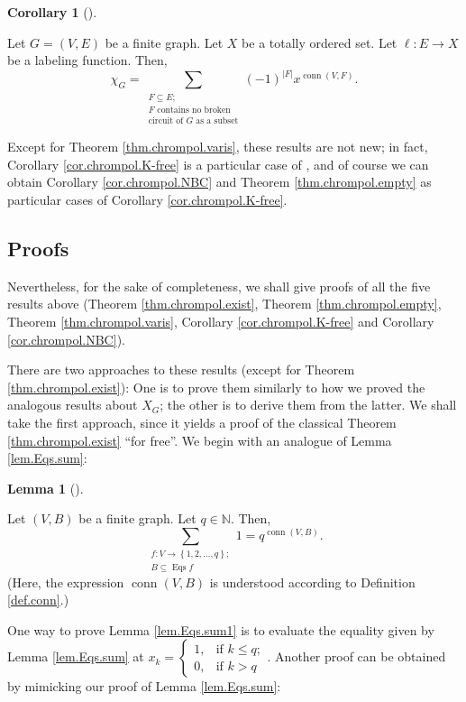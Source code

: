 \documentclass[numbers=enddot,12pt,final,onecolumn,notitlepage]{scrartcl}%
\theoremstyle{definition}
\newtheorem{lem}[theo]{Lemma}
\newenvironment{lemma}[1][]
{\begin{lem}[#1]\begin{leftbar}}
{\end{leftbar}\end{lem}}
\newtheorem{coro}[theo]{Corollary}
\newenvironment{corollary}[1][]
{\begin{coro}[#1]\begin{leftbar}}
{\end{leftbar}\end{coro}}
\let\sumnonlimits\sum
\renewcommand{\sum}{\sumnonlimits\limits}
\begin{document}
\begin{corollary}
\label{cor.chrompol.NBC}Let $G=\left(  V,E\right)  $ be a finite graph. Let
$X$ be a totally ordered set. Let $\ell:E\rightarrow X$ be a labeling
function. Then,%
\[
\chi_{G}=\sum_{\substack{F\subseteq E;\\F\text{ contains no broken}%
\\\text{circuit of }G\text{ as a subset}}}\left(  -1\right)  ^{\left\vert
F\right\vert }x^{\operatorname*{conn}\left(  V,F\right)  }.
\]

\end{corollary}

Except for Theorem \ref{thm.chrompol.varis}, these results are not new; in
fact, Corollary \ref{cor.chrompol.K-free} is a particular case of
\cite[(12)]{DohTri14}, and of course we can obtain Corollary
\ref{cor.chrompol.NBC} and Theorem \ref{thm.chrompol.empty} as particular
cases of Corollary \ref{cor.chrompol.K-free}.

\subsection{Proofs}

Nevertheless, for the sake of completeness, we shall give proofs of all the
five results above (Theorem \ref{thm.chrompol.exist}, Theorem
\ref{thm.chrompol.empty}, Theorem \ref{thm.chrompol.varis}, Corollary
\ref{cor.chrompol.K-free} and Corollary \ref{cor.chrompol.NBC}).

There are two approaches to these results (except for Theorem
\ref{thm.chrompol.exist}): One is to prove them similarly to how we proved the
analogous results about $X_{G}$; the other is to derive them from the latter.
We shall take the first approach, since it yields a proof of the classical
Theorem \ref{thm.chrompol.exist} \textquotedblleft for free\textquotedblright.
We begin with an analogue of Lemma \ref{lem.Eqs.sum}:

\begin{lemma}
\label{lem.Eqs.sum1}Let $\left(  V,B\right)  $ be a finite graph. Let
$q\in\mathbb{N}$. Then,%
\[
\sum_{\substack{f:V\rightarrow\left\{  1,2,\ldots,q\right\}  ;\\B\subseteq
\operatorname*{Eqs}f}}1=q^{\operatorname*{conn}\left(  V,B\right)  }.
\]
(Here, the expression $\operatorname*{conn}\left(  V,B\right)  $ is understood
according to Definition \ref{def.conn}.)
\end{lemma}

One way to prove Lemma \ref{lem.Eqs.sum1} is to evaluate the equality given by
Lemma \ref{lem.Eqs.sum} at $x_{k}=%
\begin{cases}
1, & \text{if }k\leq q;\\
0, & \text{if }k>q
\end{cases}
$. Another proof can be obtained by mimicking our proof of Lemma
\ref{lem.Eqs.sum}:
\end{document}
